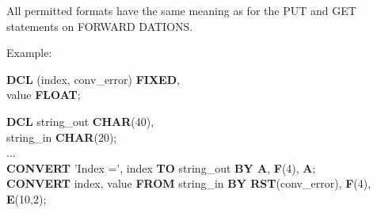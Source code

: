 




All permitted formats have the same meaning as for the PUT and GET
statements 
on FORWARD DATIONS.

Example:

\begin{tabbing}
{\bf DCL} (index, conv\_error) \= {\bf FIXED},\\
\x        value                \> {\bf FLOAT};\\
\end{tabbing}

{\bf DCL} string\_out {\bf CHAR}(40),\\
\x string\_in {\bf CHAR}(20);\\
...\\
{\bf CONVERT} 'Index =', index {\bf TO} string\_out 
    {\bf BY A}, {\bf F}(4), {\bf A};\\
{\bf CONVERT} index, value {\bf FROM} string\_in {\bf BY RST}(conv\_error), {\bf F}(4), {\bf E}(10,2);

